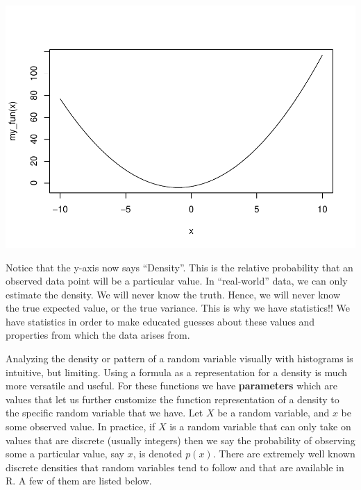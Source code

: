 \documentclass[
]{book}
\newenvironment{Shaded}{\begin{snugshade}}{\end{snugshade}}
\newcommand{\DataTypeTok}[1]{\textcolor[rgb]{0.13,0.29,0.53}{#1}}
\newcommand{\DecValTok}[1]{\textcolor[rgb]{0.00,0.00,0.81}{#1}}
\newcommand{\FloatTok}[1]{\textcolor[rgb]{0.00,0.00,0.81}{#1}}
\newcommand{\KeywordTok}[1]{\textcolor[rgb]{0.13,0.29,0.53}{\textbf{#1}}}
\newcommand{\NormalTok}[1]{#1}
\newcommand{\OperatorTok}[1]{\textcolor[rgb]{0.81,0.36,0.00}{\textbf{#1}}}
\newcommand{\OtherTok}[1]{\textcolor[rgb]{0.56,0.35,0.01}{#1}}
\newcommand{\StringTok}[1]{\textcolor[rgb]{0.31,0.60,0.02}{#1}}
\begin{document}
\begin{Shaded}
\end{Shaded}

\includegraphics{_main_files/figure-latex/unnamed-chunk-277-1.pdf}

Notice that the y-axis now says ``Density''. This is the relative probability that an observed data point will be a particular value. In ``real-world'' data, we can only estimate the density. We will never know the truth. Hence, we will never know the true expected value, or the true variance. This is why we have statistics!! We have statistics in order to make educated guesses about these values and properties from which the data arises from.

Analyzing the density or pattern of a random variable visually with histograms is intuitive, but limiting. Using a formula as a representation for a density is much more versatile and useful. For these functions we have \textbf{parameters} which are values that let us further customize the function representation of a density to the specific random variable that we have. Let \(X\) be a random variable, and \(x\) be some observed value. In practice, if \(X\) is a random variable that can only take on values that are discrete (usually integers) then we say the probability of observing some a particular value, say \(x\), is denoted \(p(x)\). There are extremely well known discrete densities that random variables tend to follow and that are available in R. A few of them are listed below.
\end{document}
